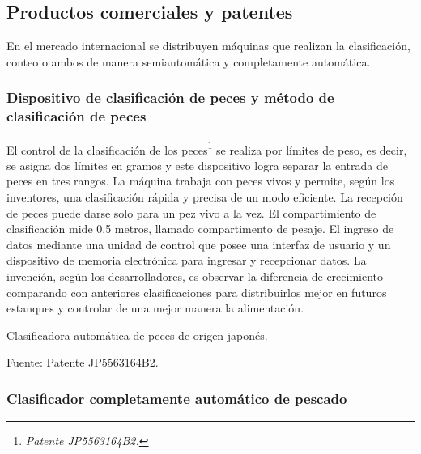 \subsection{Productos comerciales y patentes}
\label{ssec:productos comerciales y patentes}

En el mercado internacional se distribuyen máquinas que realizan la clasificación, conteo o ambos de manera semiautomática y completamente automática. 

\subsubsection{Dispositivo de clasificación de peces y método de clasificación de peces}

El control de la clasificación de los peces\footnote{\textit{Patente JP5563164B2.}} se realiza por límites de peso, es decir, se asigna dos límites en gramos y este dispositivo logra separar la entrada de peces en tres rangos. La máquina trabaja con peces vivos y permite, según los inventores, una clasificación rápida y precisa de un modo eficiente. La recepción de peces puede darse solo para un pez vivo a la vez. El compartimiento de clasificación mide 0.5 metros, llamado compartimento de pesaje. El ingreso de datos mediante una unidad de control que posee una interfaz de usuario y un dispositivo de memoria electrónica para ingresar y recepcionar datos. La invención, según los desarrolladores, es observar la diferencia de crecimiento comparando con anteriores clasificaciones para distribuirlos mejor en futuros estanques y controlar de una mejor manera la alimentación.\citep{2010}

\begin{myfigure}[H]
	\footnotesize\centering
	\caption{Clasificadora automática de peces de origen japonés.}
	\begin{myflushcenter}
		Fuente: Patente JP5563164B2.
	\end{myflushcenter}
	\label{fig:clasificadora automatica de peces de origen japones}
\end{myfigure}

\subsubsection{Clasificador completamente automático de pescado}

